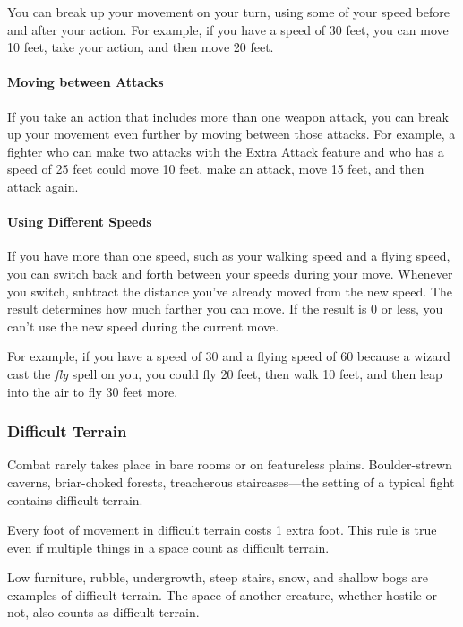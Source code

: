 \documentclass[
]{article}
\begin{document}
You can break up your movement on your turn, using some of your speed
before and after your action. For example, if you have a speed of 30
feet, you can move 10 feet, take your action, and then move 20 feet.

\hypertarget{moving-between-attacks}{%
\paragraph{Moving between Attacks}\label{moving-between-attacks}}

If you take an action that includes more than one weapon attack, you can
break up your movement even further by moving between those attacks. For
example, a fighter who can make two attacks with the Extra Attack
feature and who has a speed of 25 feet could move 10 feet, make an
attack, move 15 feet, and then attack again.

\hypertarget{using-different-speeds}{%
\paragraph{Using Different Speeds}\label{using-different-speeds}}

If you have more than one speed, such as your walking speed and a flying
speed, you can switch back and forth between your speeds during your
move. Whenever you switch, subtract the distance you've already moved
from the new speed. The result determines how much farther you can move.
If the result is 0 or less, you can't use the new speed during the
current move.

For example, if you have a speed of 30 and a flying speed of 60 because
a wizard cast the \emph{fly} spell on you, you could fly 20 feet, then
walk 10 feet, and then leap into the air to fly 30 feet more.

\hypertarget{difficult-terrain}{%
\subsubsection{Difficult Terrain}\label{difficult-terrain}}

Combat rarely takes place in bare rooms or on featureless plains.
Boulder-strewn caverns, briar-choked forests, treacherous
staircases---the setting of a typical fight contains difficult terrain.

Every foot of movement in difficult terrain costs 1 extra foot. This
rule is true even if multiple things in a space count as difficult
terrain.

Low furniture, rubble, undergrowth, steep stairs, snow, and shallow bogs
are examples of difficult terrain. The space of another creature,
whether hostile or not, also counts as difficult terrain.
\end{document}
